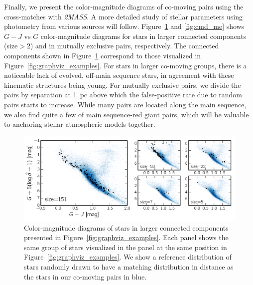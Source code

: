 \documentclass[manuscript, letterpaper]{aastex6}
\newcommand{\project}[1]{\textsl{#1}}
\newcommand{\acronym}[1]{{\small{#1}}}
\newcommand{\tmass}{\project{\acronym{2MASS}}}
\begin{document}
Finally, we present the color-magnitude diagrams of co-moving pairs
using the cross-matches with \tmass.
A more detailed study of stellar parameters using photometry from various sources
will follow. Figure~\ref{fig:cmd_large} and \ref{fig:cmd_me} shows $G-J$ vs $G$
color-magnitude diagrams for stars in larger connected components (size$>2$)
and in mutually exclusive pairs, respectively.
The connected components shown in Figure~\ref{fig:cmd_large}
correspond to those visualized
in Figure~\ref{fig:graphviz_examples}.
For stars in larger co-moving groups, there is a noticeable
lack of evolved, off-main sequence
stars, in agreement with these kinematic structures being young.
For mutually exclusive pairs, we divide the pairs by separation at 1~pc
above which the false-positive rate due to random pairs starts to increase.
While many pairs are located along the main sequence, we also find
quite a few of main sequence-red giant pairs,
which will be valuable to anchoring stellar atmospheric models together.

\begin{figure}[htbp]
  \begin{center}
    \includegraphics[width=\textwidth]{figures/gjg_graphviz_examples.pdf}
  \end{center}
  \caption{
    Color-magnitude diagrams of stars in larger connected components presented in
    Figure~\ref{fig:graphviz_examples}. Each panel shows the same group
    of stars visualized in the panel at the same position
    in Figure~\ref{fig:graphviz_examples}.
    We show a reference distribution of stars randomly drawn to have
    a matching distribution in distance as the stars in our co-moving pairs
    in blue.
    \label{fig:cmd_large}}
\end{figure}
\end{document}
